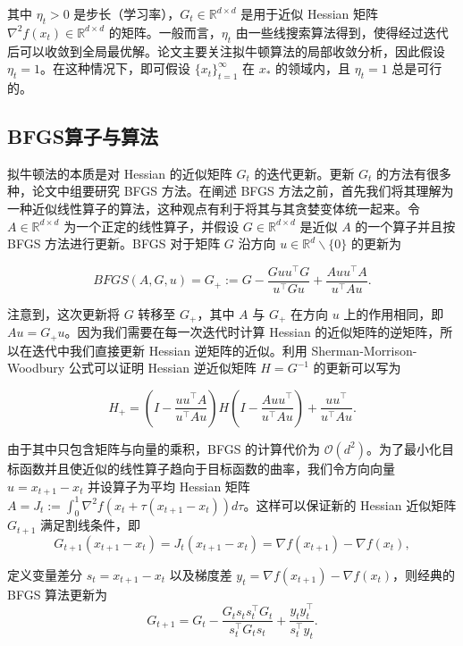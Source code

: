 \documentclass[a4paper,twoside,AutoFakeBold]{article}
\theoremstyle{definition}
\begin{document}
其中 $\eta_t > 0$ 是步长（学习率），$G_t\in \mathbb{R}^{d\times d}$ 是用于近似 Hessian 矩阵 $\nabla^2 f(x_t)\in \mathbb{R}^{d\times d}$ 的矩阵。一般而言，$\eta_t$ 由一些线搜索算法得到，使得经过迭代后可以收敛到全局最优解。论文主要关注拟牛顿算法的局部收敛分析，因此假设 $\eta_t = 1$。在这种情况下，即可假设 $\{x_t\}_{t = 1}^{\infty}$ 在 $x_*$ 的领域内，且 $\eta_t = 1$ 总是可行的。

\subsection{BFGS算子与算法}\label{section:standard_BFGS}

拟牛顿法的本质是对 Hessian 的近似矩阵 $G_t$ 的迭代更新。更新 $G_t$ 的方法有很多种，论文中组要研究 BFGS 方法。在阐述 BFGS 方法之前，首先我们将其理解为一种近似线性算子的算法，这种观点有利于将其与其贪婪变体统一起来。令 $ A \in \mathbb{R}^{d \times d}$ 为一个正定的线性算子，并假设 $ G \in \mathbb{R}^{d \times d}$ 是近似 $A$ 的一个算子并且按 BFGS 方法进行更新。BFGS 对于矩阵 $G$ 沿方向 $u \in \mathbb{R}^{d}\backslash\{0\}$ 的更新为

\begin{equation}\label{BFGS_update}
    BFGS(A, G, u) = G_+ := G - \frac{G u u^\top G}{u^\top G u} + \frac{A u u^\top A}{u^\top A u}.
\end{equation}

注意到，这次更新将 $G$ 转移至 $G_+$，其中 $A$ 与 $G_+$ 在方向 $u$ 上的作用相同，即 $Au=G_+u$。因为我们需要在每一次迭代时计算 Hessian 的近似矩阵的逆矩阵，所以在迭代中我们直接更新 Hessian 逆矩阵的近似。利用 Sherman-Morrison-Woodbury 公式可以证明 Hessian 逆近似矩阵 $H = G^{-1}$ 的更新可以写为

\begin{equation}\label{BFGS_inverse_update}
    H_+ = \left(I-\frac{u u^\top A}{u^\top Au}\right) H \left(I-\frac{ Au u^\top}{u^\top Au}\right) +\frac{u u^\top}{u^\top Au}.
\end{equation}

由于其中只包含矩阵与向量的乘积，BFGS 的计算代价为 $\mathcal{O}(d^2)$。为了最小化目标函数并且使近似的线性算子趋向于目标函数的曲率，我们令方向向量 $u =x_{t+1}-x_t$ 并设算子为平均 Hessian 矩阵 $A = J_t:= \int_{0}^{1}\nabla^2{f(x_t + \tau(x_{t+1} - x_t))}d\tau$。这样可以保证新的 Hessian 近似矩阵 $G_{t+1}$ 满足割线条件，即 $$G_{t+1} (x_{t+1}-x_t)=J_t(x_{t+ 1}-x_t) = \nabla f(x_{t+1})-\nabla f(x_t), $$

定义变量差分 $s_t = x_{t+1}-x_t$ 以及梯度差 $y_t = \nabla f(x_{t+1})-\nabla f(x_t)$，则经典的 BFGS 算法更新为
\begin{equation}\label{BFGS_standard_update}
    G_{t+1} = G_t - \frac{G_t s_t s_t^\top G_t}{s_t^\top G_t s_t} + \frac{y_t y_t^\top}{s_t^\top y_t}.
\end{equation}
\end{document}
